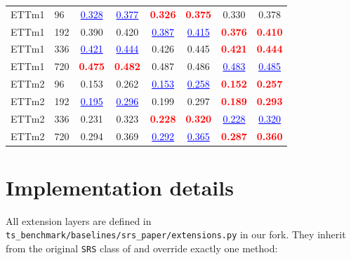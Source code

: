 \begin{table}[h]
\begin{center}
\begin{tabular}{ll|cc|cc|cc}
    \midrule
    ETTm1 & 96  & \textcolor{blue}{\underline{0.328}} & \textcolor{blue}{\underline{0.377}} & \textcolor{red}{\textbf{0.326}} & \textcolor{red}{\textbf{0.375}} & 0.330 & 0.378 \\
    ETTm1 & 192 & 0.390 & 0.420 & \textcolor{blue}{\underline{0.387}} & \textcolor{blue}{\underline{0.415}} & \textcolor{red}{\textbf{0.376}} & \textcolor{red}{\textbf{0.410}} \\
    ETTm1 & 336 & \textcolor{blue}{\underline{0.421}} & \textcolor{blue}{\underline{0.444}} & 0.426 & 0.445 & \textcolor{red}{\textbf{0.421}} & \textcolor{red}{\textbf{0.444}} \\
    ETTm1 & 720 & \textcolor{red}{\textbf{0.475}} & \textcolor{red}{\textbf{0.482}} & 0.487 & 0.486 & \textcolor{blue}{\underline{0.483}} & \textcolor{blue}{\underline{0.485}} \\
    \midrule
    ETTm2 & 96  & 0.153 & 0.262 & \textcolor{blue}{\underline{0.153}} & \textcolor{blue}{\underline{0.258}} & \textcolor{red}{\textbf{0.152}} & \textcolor{red}{\textbf{0.257}} \\
    ETTm2 & 192 & \textcolor{blue}{\underline{0.195}} & \textcolor{blue}{\underline{0.296}} & 0.199 & 0.297 & \textcolor{red}{\textbf{0.189}} & \textcolor{red}{\textbf{0.293}} \\
    ETTm2 & 336 & 0.231 & 0.323 & \textcolor{red}{\textbf{0.228}} & \textcolor{red}{\textbf{0.320}} & \textcolor{blue}{\underline{0.228}} & \textcolor{blue}{\underline{0.320}} \\
    ETTm2 & 720 & 0.294 & 0.369 & \textcolor{blue}{\underline{0.292}} & \textcolor{blue}{\underline{0.365}} & \textcolor{red}{\textbf{0.287}} & \textcolor{red}{\textbf{0.360}} \\
    \bottomrule
  \end{tabular}
  \end{center}
\end{table}

\section{Implementation details}
\label{app:implementation}

All extension layers are defined in
\verb|ts_benchmark/baselines/srs_paper/extensions.py| in our
fork. They inherit from the original \texttt{SRS} class of
\citet{wu2025srsnet} and override exactly one method:

